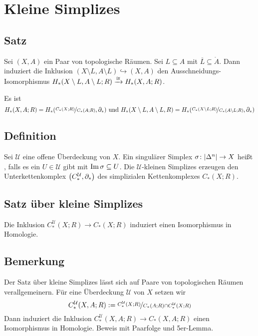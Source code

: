 \section{Kleine Simplizes} %
\label{sec:13}

\subsection[Satz: Ausschneidungs-Isomorphismus]{Satz} %
\label{sub:131}
Sei $(X,A)$ ein Paar von topologische Räumen. Sei $L \subseteq A$ mit $\overline{L} \subseteq \mathring{A}$. Dann induziert die Inklusion 
$(X \setminus L, A \setminus L) \hookrightarrow (X,A)$ den Ausschneidungs-Isomorphismus $H_* \enbrace*{X \setminus L, A \setminus L;R} \xrightarrow{\cong} H_*(X,A;R)$.

Es ist 
\[
	H_*(X,A;R) = H_* \enbrace*{\nicefrac{C_*(X;R)}{C_*(A;R)},\partial_*}  \text{ und } H_*\enbrace*{X\setminus L, A \setminus L,R} = H_* \enbrace*{ 
	\nicefrac{C_*(X \setminus L;R)}{C_*(A \setminus L;R)}, \partial_*}  
\]

\subsection[Definition: $\mathcal{U}$-klein]{Definition} %
\label{sub:132}
Sei $\mathcal{U}$ eine offene Überdeckung von $X$. Ein singulärer Simplex $\sigma \colon \abs*{\Delta^n} \to X$ heißt 
, falls es ein $U \in \mathcal{U}$ gibt mit $\im \sigma  \subseteq U$. Die $\mathcal{U}$-kleinen Simplizes 
erzeugen den Unterkettenkomplex $\enbrace*{C_*^{\mathcal{U}},\partial_*}$ des simplizialen Kettenkomplexes $C_*(X;R)$.

\subsection{Satz über kleine Simplizes} %
\label{sub:133}
Die Inklusion $C_*^\mathcal{U}(X;R) \to C_*(X;R)$ induziert einen Isomorphismus in Homologie.

\subsection{Bemerkung} %
\label{sub:134}
Der Satz über kleine Simplizes lässt sich auf Paare von topologischen Räumen verallgemeinern. Für eine Überdeckung $\mathcal{U}$ von $X$ setzen wir 
\[
	C_*^\mathcal{U} \enbrace*{X,A;R} := \nicefrac{C_*^\mathcal{U}(X;R)}{C_*(A;R) \cap C_*^\mathcal{U}(X;R)} 
\]
Dann induziert die Inklusion $C_*^\mathcal{U}(X,A;R) \to C_*(X,A;R)$ einen Isomorphismus in Homologie. Beweis mit Paarfolge und 5er-Lemma.

